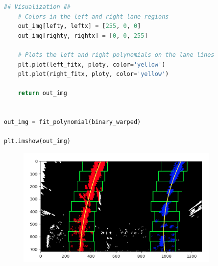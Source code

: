 \documentclass[12pt]{article}
\begin{document}
\begin{lstlisting}[language=Python]
    ## Visualization ##
    # Colors in the left and right lane regions
    out_img[lefty, leftx] = [255, 0, 0]
    out_img[righty, rightx] = [0, 0, 255]

    # Plots the left and right polynomials on the lane lines
    plt.plot(left_fitx, ploty, color='yellow')
    plt.plot(right_fitx, ploty, color='yellow')

    return out_img


out_img = fit_polynomial(binary_warped)

plt.imshow(out_img)
\end{lstlisting}

\begin{figure}[htp]
    \centering
    \includegraphics[width=10cm]{sliding_window_output.png}
    \label{fig:sliding_window_output}
\end{figure}
\end{document}
